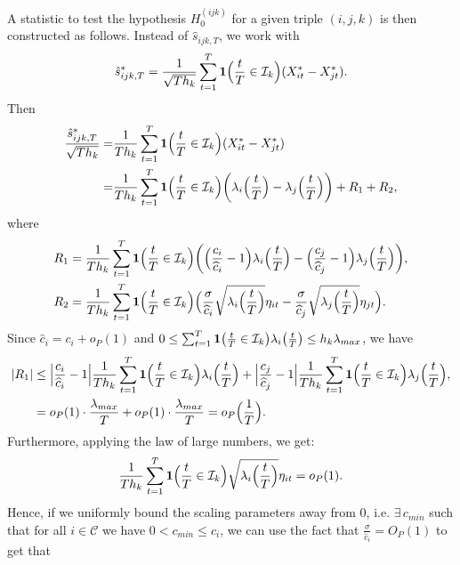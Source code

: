 \documentclass[a4paper,12pt]{article}
\numberwithin{equation}{section}
\begin{document}
{A statistic to test the hypothesis $H_0^{(ijk)}$ for a given triple $(i,j,k)$ is then constructed as follows. Instead of $\hat{s}_{ijk,T}$, we work with 
\[ \hat{s}_{ijk,T}^* = \frac{1}{\sqrt{Th_k}} \sum\limits_{t=1}^T \boldsymbol{1}\Big(\frac{t}{T} \in \mathcal{I}_k\Big) (X_{it}^* - X_{jt}^*). \]
Then
\begin{align*}
\frac{\hat{s}_{ijk,T}^*}{\sqrt{Th_k}} =& \frac{1}{Th_k} \sum\limits_{t=1}^T \boldsymbol{1}\Big(\frac{t}{T} \in \mathcal{I}_k\Big) (X_{it}^* - X_{jt}^*)\\
=& \frac{1}{Th_k} \sum\limits_{t=1}^T \boldsymbol{1}\Big(\frac{t}{T} \in \mathcal{I}_k\Big) \bigg( \lambda_i \Big(\frac{t}{T}\Big)  - \lambda_j \Big(\frac{t}{T}\Big)\bigg) + R_1 + R_2,
\end{align*}
where
\begin{align*}
R_1 &= \frac{1}{Th_k} \sum\limits_{t=1}^T \boldsymbol{1}\Big(\frac{t}{T} \in \mathcal{I}_k\Big) \bigg( \Big(\frac{c_i}{\widehat{c}_i} - 1 \Big) \lambda_i \Big(\frac{t}{T}\Big)  - \Big(\frac{c_j}{\widehat{c}_j} - 1 \Big) \lambda_j \Big(\frac{t}{T}\Big)\bigg),\\
R_2& =  \frac{1}{Th_k} \sum\limits_{t=1}^T \boldsymbol{1}\Big(\frac{t}{T} \in \mathcal{I}_k\Big) \Big( \frac{\sigma}{\widehat{c}_i} \sqrt{\lambda_i\Big(\frac{t}{T}\Big)} \eta_{it} - \frac{\sigma}{\widehat{c}_j} \sqrt{\lambda_j\Big(\frac{t}{T}\Big)} \eta_{jt} \Big).
\end{align*}
Since $\widehat{c}_i = c_i + o_P(1)$ and $0 \leq  \sum\nolimits_{t=1}^T \boldsymbol{1}\big(\frac{t}{T} \in \mathcal{I}_k\big) \lambda_i \big(\frac{t}{T}\big) \leq h_k \lambda_{max}$, we have
\begin{align}\label{eq:aux1}
|R_1| &\leq \Big|\frac{c_i}{\widehat{c}_i} - 1 \Big| \frac{1}{Th_k} \sum\limits_{t=1}^T \boldsymbol{1}\Big(\frac{t}{T} \in \mathcal{I}_k\Big) \lambda_i \Big(\frac{t}{T}\Big)  + \Big|\frac{c_j}{\widehat{c}_j} - 1 \Big| \frac{1}{Th_k} \sum\limits_{t=1}^T \boldsymbol{1}\Big(\frac{t}{T} \in \mathcal{I}_k\Big) \lambda_j \Big(\frac{t}{T}\Big),\nonumber \\
&= o_P(1) \cdot \frac{\lambda_{max}}{T} + o_P(1) \cdot \frac{\lambda_{max}}{T} = o_P\Big(\frac{1}{T}\Big).
\end{align}
Furthermore, applying the law of large numbers, we get:
\begin{align*}
 \frac{1}{Th_k} \sum\limits_{t=1}^T \boldsymbol{1}\Big(\frac{t}{T} \in \mathcal{I}_k\Big) \sqrt{\lambda_i\Big(\frac{t}{T}\Big)} \eta_{it}  = o_P(1).
\end{align*}
Hence, if we uniformly bound the scaling parameters away from 0, i.e. $\exists \, c_{min}$ such that for all $i \in \mathcal{C}$ we have $0 < c_{min} \leq c_i$, we can use the fact that $\frac{\sigma}{\widehat{c}_i} = O_P(1)$ to get that
}
\end{document}
